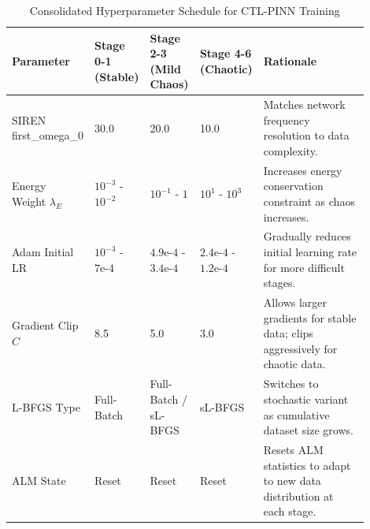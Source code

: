\documentclass[11pt, a4paper]{article}
\begin{document}
\begin{table}[H]
\centering
\caption{Consolidated Hyperparameter Schedule for CTL-PINN Training}
\label{tab:hyperparameter_schedule}
\renewcommand{\arraystretch}{1.2}
\begin{tabular}{p{0.18\linewidth} p{0.14\linewidth} p{0.14\linewidth} p{0.14\linewidth} p{0.3\linewidth}}
\toprule
\textbf{Parameter} & \textbf{Stage 0-1 (Stable)} & \textbf{Stage 2-3 (Mild Chaos)} & \textbf{Stage 4-6 (Chaotic)} & \textbf{Rationale} \\
\midrule
SIREN first\_omega\_0 & 30.0 & 20.0 & 10.0 & Matches network frequency resolution to data complexity. \\
Energy Weight $\lambda_E$ & $10^{-3}$ - $10^{-2}$ & $10^{-1}$ - $1$ & $10^{1}$ - $10^{3}$ & Increases energy conservation constraint as chaos increases. \\
Adam Initial LR & $10^{-3}$ - $7\text{e-}4$ & $4.9\text{e-}4$ - $3.4\text{e-}4$ & $2.4\text{e-}4$ - $1.2\text{e-}4$ & Gradually reduces initial learning rate for more difficult stages. \\
Gradient Clip $C$ & 8.5 & 5.0 & 3.0 & Allows larger gradients for stable data; clips aggressively for chaotic data. \\
L-BFGS Type & Full-Batch & Full-Batch / sL-BFGS & sL-BFGS & Switches to stochastic variant as cumulative dataset size grows. \\
ALM State & Reset & Reset & Reset & Resets ALM statistics to adapt to new data distribution at each stage. \\
\bottomrule
\end{tabular}
\renewcommand{\arraystretch}{1.0}
\end{table}
\end{document}
